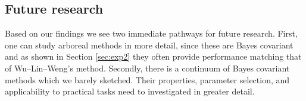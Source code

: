 \subsection{Future research}

Based on our findings we see two immediate pathways for future research. First, one can study arboreal methods in more detail, since these are Bayes covariant and as shown in Section \ref{sec:exp2} they often provide performance matching that of Wu--Lin--Weng's method. Secondly, there is a continuum of Bayes covariant methods which we barely sketched. Their properties, parameter selection,  and applicability to practical tasks need to investigated in greater detail.



%
%
%
%
%
